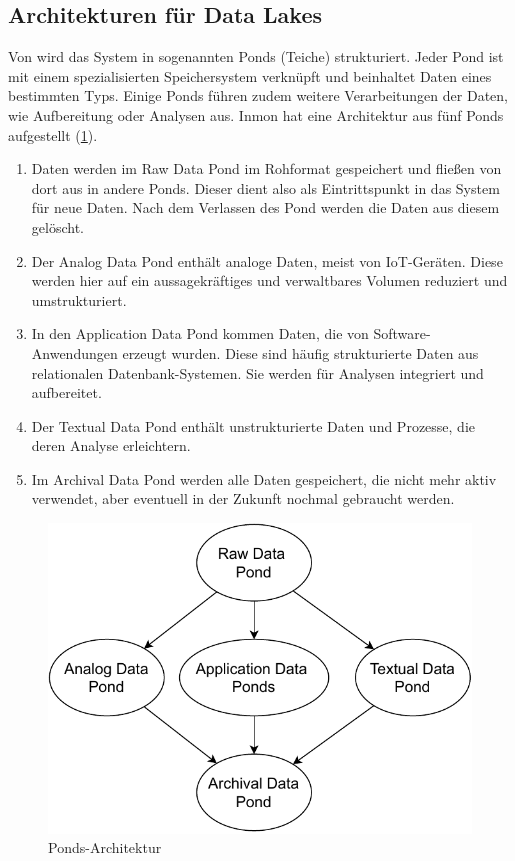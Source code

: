 \subsection{Architekturen für Data Lakes}
Von \textcite{inmon2016data} wird das System in sogenannten Ponds (Teiche) strukturiert.
Jeder Pond ist mit einem spezialisierten Speichersystem verknüpft und beinhaltet Daten eines bestimmten Typs.
Einige Ponds führen zudem weitere Verarbeitungen der Daten, wie Aufbereitung oder Analysen aus.
Inmon hat eine Architektur aus fünf Ponds aufgestellt (\cref{fig:datalake-ponds}).
\begin{enumerate}
    \item Daten werden im Raw Data Pond im Rohformat gespeichert und fließen von dort aus in andere Ponds.
          Dieser dient also als Eintrittspunkt in das System für neue Daten.
          Nach dem Verlassen des Pond werden die Daten aus diesem gelöscht.
    \item Der Analog Data Pond enthält analoge Daten, meist von IoT-Geräten.
          Diese werden hier auf ein aussagekräftiges und verwaltbares Volumen reduziert und umstrukturiert.
    \item In den Application Data Pond kommen Daten, die von Software-Anwendungen erzeugt wurden.
          Diese sind häufig strukturierte Daten aus relationalen Daten\-bank-Systemen.
          Sie werden für Analysen integriert und aufbereitet.
    \item Der Textual Data Pond enthält unstrukturierte Daten und Prozesse, die deren Analyse erleichtern.
    \item Im Archival Data Pond werden alle Daten gespeichert, die nicht mehr aktiv verwendet, aber eventuell in der Zukunft nochmal gebraucht werden.
\end{enumerate}
\begin{figure}
    \centering
    \includegraphics[width=.8\textwidth]{Grafiken/Grundlagen-Ponds.pdf}
    \caption{Ponds-Architektur \parencite[nach: ][S. 27]{inmon2016data}}
    \label{fig:datalake-ponds}
\end{figure}

